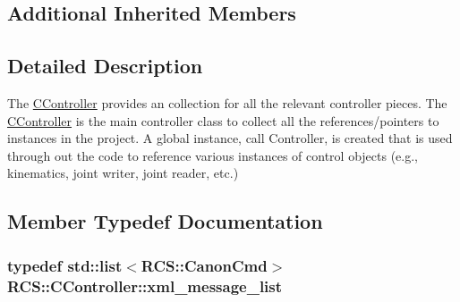\subsection*{Additional Inherited Members}


\subsection{Detailed Description}
The \hyperlink{structRCS_1_1CController}{C\-Controller} provides an collection for all the relevant controller pieces. The \hyperlink{structRCS_1_1CController}{C\-Controller} is the main controller class to collect all the references/pointers to instances in the project. A global instance, call Controller, is created that is used through out the code to reference various instances of control objects (e.\-g., kinematics, joint writer, joint reader, etc.) 

\subsection{Member Typedef Documentation}
\hypertarget{structRCS_1_1CController_aeaee07d36d39b56ecad1ce2443b5b4c0}{
\subsubsection[{xml\-\_\-message\-\_\-list}]{\setlength{\rightskip}{0pt plus 5cm}typedef std\-::list$<${\bf R\-C\-S\-::\-Canon\-Cmd}$>$ {\bf R\-C\-S\-::\-C\-Controller\-::xml\-\_\-message\-\_\-list}}}\label{structRCS_1_1CController_aeaee07d36d39b56ecad1ce2443b5b4c0}


